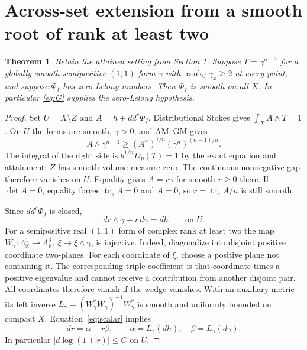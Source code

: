 \documentclass[11pt]{article}
\newcommand{\ddc}{dd^c}
\newcommand{\rank}{\operatorname{rank}}
\newcommand{\1}{\mathbf 1}
\newtheorem{theorem}{Theorem}
\theoremstyle{remark}\newtheorem{remark}[theorem]{Remark}
\begin{document}
\section{Across-set extension from a smooth root of rank at least two}
\begin{theorem}\label{th:extension}
Retain the attained setting from Section 1. Suppose $T=\gamma^{n-1}$ for
a globally smooth semipositive $(1,1)$ form $\gamma$ with
$\rank_{\mathbb C}\gamma_x\geq2$ at every point, and suppose $\Phi_f$
has zero Lelong numbers. Then $\Phi_f$ is smooth on all $X$.
In particular \eqref{eq:G} supplies the zero-Lelong hypothesis.
\end{theorem}
\begin{proof}
Set $U=X\setminus Z$ and $A=h+\ddc\Phi_f$.
Distributional Stokes gives $\int_XA\wedge T=1$.
On $U$ the forms are smooth, $\gamma>0$, and AM--GM gives
\[
 A\wedge\gamma^{n-1}\geq(A^n)^{1/n}(\gamma^n)^{(n-1)/n}.
\]
The integral of the right side is $b^{1/n}D_p(T)=1$ by the exact equation
and attainment; $Z$ has smooth-volume measure zero.
The continuous nonnegative gap therefore vanishes on $U$.
Equality gives $A=r\gamma$ for smooth $r\geq0$ there.
If $\det A=0$, equality forces $\operatorname{tr}_\gamma A=0$ and $A=0$,
so $r=\operatorname{tr}_\gamma A/n$ is still smooth.

Since $\ddc\Phi_f$ is closed,
\begin{equation}\label{eq:scalar}
 dr\wedge\gamma+r\,d\gamma=dh\qquad\text{on }U.
\end{equation}
For a semipositive real $(1,1)$ form of complex rank at least two the map
$W_\gamma:\Lambda^1_{\mathbb R}\to\Lambda^3_{\mathbb R}$,
$\xi\mapsto\xi\wedge\gamma$, is injective.
Indeed, diagonalize into disjoint positive coordinate two-planes.
For each coordinate of $\xi$, choose a positive plane not containing it.
The corresponding triple coefficient is that coordinate times a positive
eigenvalue and cannot receive a contribution from another disjoint pair.
All coordinates therefore vanish if the wedge vanishes.
With an auxiliary metric its left inverse
$L_\gamma=(W_\gamma^*W_\gamma)^{-1}W_\gamma^*$ is smooth and uniformly
bounded on compact $X$. Equation~\eqref{eq:scalar} implies
\begin{equation}\label{eq:ode}
 dr=\alpha-r\beta,\qquad
 \alpha=L_\gamma(dh),\quad\beta=L_\gamma(d\gamma).
\end{equation}
In particular $|d\log(1+r)|\leq C$ on $U$.


\end{proof}
\end{document}
